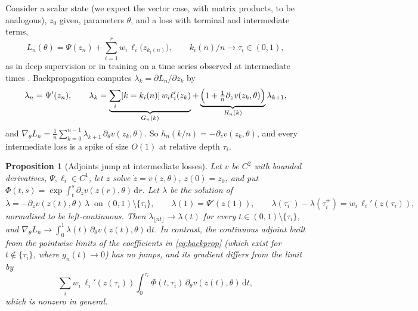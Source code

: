 \documentclass[11pt]{article}
\newtheorem{proposition}[theorem]{Proposition}
\theoremstyle{definition}
\theoremstyle{remark}
\newcommand{\dd}{\,\mathrm{d}}
\newcommand{\1}{\mathbf{1}}
\newcommand{\fl}[1]{\lfloor #1\rfloor}
\begin{document}
Consider a scalar state (we expect the vector case, with matrix products, to be analogous),
$z_0$ given, parameters $\theta$, and a loss with terminal and intermediate terms,
\begin{equation}\label{eq:loss}
L_n(\theta)=\Psi(z_n)+\sum_{i=1}^r w_i\,\ell_i\bigl(z_{k_i(n)}\bigr),\qquad k_i(n)/n\to\tau_i\in(0,1),
\end{equation}
as in deep supervision or in training on a time series observed at intermediate times
\cite{RCD19}. Backpropagation computes $\lambda_k=\partial L_n/\partial z_k$ by
\begin{equation}\label{eq:backprop}
\lambda_n=\Psi'(z_n),\qquad
\lambda_k=\underbrace{\sum_i[k=k_i(n)]\,w_i\ell_i'(z_k)}_{G_n(k)}
+\underbrace{\Bigl(1+\tfrac1n\partial_zv(z_k,\theta)\Bigr)}_{H_n(k)}\lambda_{k+1},
\end{equation}
and $\nabla_\theta L_n=\frac1n\sum_{k=0}^{n-1}\lambda_{k+1}\,\partial_\theta v(z_k,\theta)$.
So $h_n(k/n)=-\partial_zv(z_k,\theta)$, and every intermediate loss is a spike of size $O(1)$ at
relative depth $\tau_i$.

\begin{proposition}[Adjoints jump at intermediate losses]\label{prop:adjoint}
Let $v$ be $C^2$ with bounded derivatives, $\Psi,\ell_i\in C^1$, let $z$ solve $\dot z=v(z,\theta)$,
$z(0)=z_0$, and put $\Phi(t,s)=\exp\int_t^s\partial_zv(z(r),\theta)\dd r$. Let $\lambda$ be the solution of
\[
\dot\lambda=-\partial_zv(z(t),\theta)\,\lambda\ \text{ on }(0,1)\setminus\{\tau_i\},\qquad
\lambda(1)=\Psi'(z(1)),\qquad \lambda(\tau_i^-)-\lambda(\tau_i^+)=w_i\,\ell_i'(z(\tau_i)),
\]
normalised to be left-continuous. Then $\lambda_{\fl{nt}}\to\lambda(t)$ for every
$t\in(0,1)\setminus\{\tau_i\}$, and
$\nabla_\theta L_n\to\int_0^1\lambda(t)\,\partial_\theta v(z(t),\theta)\dd t$.
In contrast, the continuous adjoint built from the pointwise limits of the coefficients in
\eqref{eq:backprop} (which exist for $t\notin\{\tau_i\}$, where $g_n(t)\to0$) has no jumps, and its
gradient differs from the limit by
\[
\sum_iw_i\,\ell_i'(z(\tau_i))\int_0^{\tau_i}\Phi(t,\tau_i)\,\partial_\theta v(z(t),\theta)\dd t,
\]
which is nonzero in general.
\end{proposition}
\end{document}
